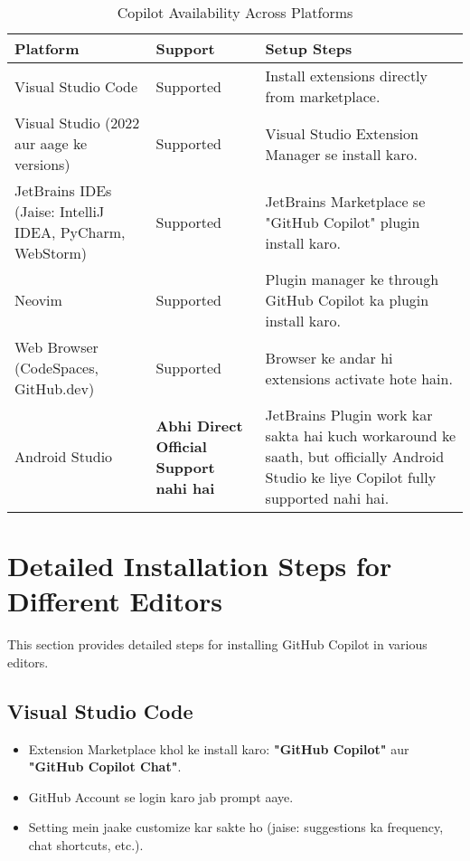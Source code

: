 \documentclass[a4paper, 12pt]{article}
\begin{document}
\begin{table}[h!]
  \centering
  \begin{tabular}{|>{\centering}p{4cm}|>{\centering}p{2.5cm}|>{\centering}p{6cm}|}
    \hline
    \textbf{Platform} & \textbf{Support} & \textbf{Setup Steps} \\
    \hline
    Visual Studio Code & Supported & Install extensions directly from marketplace. \\
    \hline
    Visual Studio (2022 aur aage ke versions) & Supported & Visual Studio Extension Manager se install karo. \\
    \hline
    JetBrains IDEs (Jaise: IntelliJ IDEA, PyCharm, WebStorm) & Supported & JetBrains Marketplace se "GitHub Copilot" plugin install karo. \\
    \hline
    Neovim & Supported & Plugin manager ke through GitHub Copilot ka plugin install karo. \\
    \hline
    Web Browser (CodeSpaces, GitHub.dev) & Supported & Browser ke andar hi extensions activate hote hain. \\
    \hline
    Android Studio & \textbf{Abhi Direct Official Support nahi hai} & JetBrains Plugin work kar sakta hai kuch workaround ke saath, but officially Android Studio ke liye Copilot fully supported nahi hai. \\
    \hline
  \end{tabular}
  \caption{Copilot Availability Across Platforms}
\end{table}

\section{Detailed Installation Steps for Different Editors}
This section provides detailed steps for installing GitHub Copilot in various editors.

\subsection{Visual Studio Code}
\begin{itemize}
    \item Extension Marketplace khol ke install karo: \textbf{\color{importantred}"GitHub Copilot"} aur \textbf{\color{importantred}"GitHub Copilot Chat"}.
    \item GitHub Account se login karo jab prompt aaye.
    \item Setting mein jaake customize kar sakte ho (jaise: suggestions ka frequency, chat shortcuts, etc.).
\end{itemize}
\end{document}
